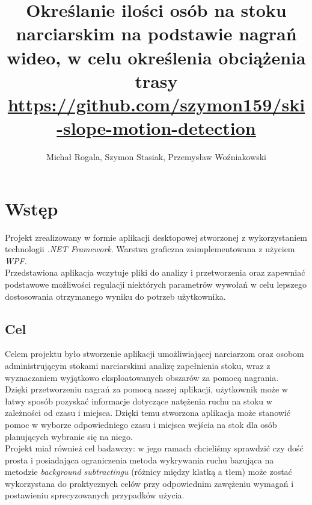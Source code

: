 \documentclass[a4paper]{article}
\title{Określanie ilości osób na stoku narciarskim na podstawie nagrań wideo, w celu określenia obciążenia trasy\\
\small \url{https://github.com/szymon159/ski-slope-motion-detection}}
\date{}
\author{Michał Rogala, Szymon Stasiak, Przemysław Woźniakowski}
\begin{document}
  \maketitle

\section{Wstęp}
Projekt zrealizowany w formie aplikacji desktopowej stworzonej z wykorzystaniem technologii \textit{.NET Framework}. Warstwa graficzna zaimplementowana z użyciem \textit{WPF}.\\
Przedstawiona aplikacja wczytuje pliki do analizy i przetworzenia oraz zapewniać podstawowe możliwości regulacji niektórych parametrów wywołań w celu lepszego dostosowania otrzymanego wyniku do potrzeb użytkownika.

\subsection{Cel}
Celem projektu było stworzenie aplikacji umożliwiającej narciarzom oraz osobom administrującym stokami narciarskimi analizę zapełnienia stoku, wraz z wyznaczaniem wyjątkowo eksploatowanych obszarów za pomocą nagrania.\\
Dzięki przetworzeniu nagrań za pomocą naszej aplikacji, użytkownik może w łatwy sposób pozyskać informacje dotyczące natężenia ruchu na stoku w zależności od czasu i miejsca. Dzięki temu stworzona aplikacja może stanowić pomoc w wyborze odpowiedniego czasu i miejsca wejścia na stok dla osób planujących wybranie się na niego.\\
Projekt miał również cel badawczy: w jego ramach chcieliśmy sprawdzić czy dość prosta i posiadająca ograniczenia metoda wykrywania ruchu bazująca na metodzie \textit{background subtractingu} (różnicy między klatką a tłem) może zostać wykorzystana do praktycznych celów przy odpowiednim zawężeniu wymagań i postawieniu sprecyzowanych przypadków użycia.
\end{document}
